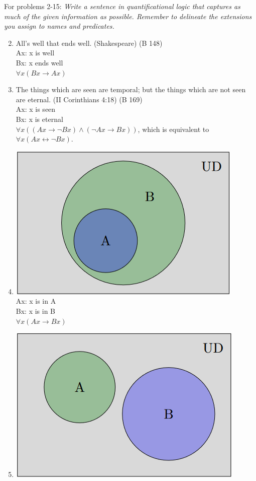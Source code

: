 \documentclass{article}
\begin{document}
\begin{flushleft}
      For problems 2-15: \textit{Write a sentence in quantificational logic that captures as much of the given information as possible. Remember to delineate the extensions you assign to names and predicates.}
\end{flushleft}
\begin{enumerate}
      \setcounter{enumi}{1}
      \item All's well that ends well. (Shakespeare) (B 148)\\
            Ax: x is well\\
            Bx: x ends well\\
            $\forall x(Bx \to Ax)$
      \item The things which are seen are temporal; but the things which are not seen are eternal. (II Corinthians 4:18) (B 169)\\
            Ax: x is seen\\
            Bx: x is eternal\\
            $\forall x((Ax \to \neg Bx) \land (\neg Ax \to Bx))$, which is equivalent to $\forall x (Ax \leftrightarrow \neg Bx)$.
      \item \includegraphics{2.1.4} \\
            Ax: x is in A\\
            Bx: x is in B\\
            $\forall x(Ax \to Bx)$
      \item \includegraphics{2.1.5}\\

\end{enumerate}
\end{document}
